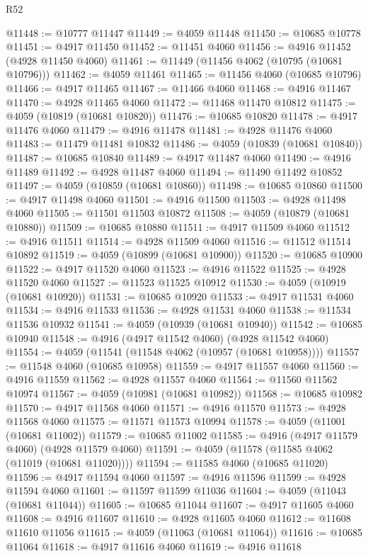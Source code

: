\begin{lexlean}{R52}
\begin{coremodule}
@11448 := @10777 @11447
@11449 := @4059 @11448
@11450 := @10685 @10778
@11451 := @4917 @11450
@11452 := @11451 @4060
@11456 := @4916 @11452 (@4928 @11450 @4060)
@11461 := @11449 (@11456 @4062 (@10795 (@10681 @10796)))
@11462 := @4059 @11461
@11465 := @11456 @4060 (@10685 @10796)
@11466 := @4917 @11465
@11467 := @11466 @4060
@11468 := @4916 @11467
@11470 := @4928 @11465 @4060
@11472 := @11468 @11470 @10812
@11475 := @4059 (@10819 (@10681 @10820))
@11476 := @10685 @10820
@11478 := @4917 @11476 @4060
@11479 := @4916 @11478
@11481 := @4928 @11476 @4060
@11483 := @11479 @11481 @10832
@11486 := @4059 (@10839 (@10681 @10840))
@11487 := @10685 @10840
@11489 := @4917 @11487 @4060
@11490 := @4916 @11489
@11492 := @4928 @11487 @4060
@11494 := @11490 @11492 @10852
@11497 := @4059 (@10859 (@10681 @10860))
@11498 := @10685 @10860
@11500 := @4917 @11498 @4060
@11501 := @4916 @11500
@11503 := @4928 @11498 @4060
@11505 := @11501 @11503 @10872
@11508 := @4059 (@10879 (@10681 @10880))
@11509 := @10685 @10880
@11511 := @4917 @11509 @4060
@11512 := @4916 @11511
@11514 := @4928 @11509 @4060
@11516 := @11512 @11514 @10892
@11519 := @4059 (@10899 (@10681 @10900))
@11520 := @10685 @10900
@11522 := @4917 @11520 @4060
@11523 := @4916 @11522
@11525 := @4928 @11520 @4060
@11527 := @11523 @11525 @10912
@11530 := @4059 (@10919 (@10681 @10920))
@11531 := @10685 @10920
@11533 := @4917 @11531 @4060
@11534 := @4916 @11533
@11536 := @4928 @11531 @4060
@11538 := @11534 @11536 @10932
@11541 := @4059 (@10939 (@10681 @10940))
@11542 := @10685 @10940
@11548 := @4916 (@4917 @11542 @4060) (@4928 @11542 @4060)
@11554 := @4059 (@11541 (@11548 @4062 (@10957 (@10681 @10958))))
@11557 := @11548 @4060 (@10685 @10958)
@11559 := @4917 @11557 @4060
@11560 := @4916 @11559
@11562 := @4928 @11557 @4060
@11564 := @11560 @11562 @10974
@11567 := @4059 (@10981 (@10681 @10982))
@11568 := @10685 @10982
@11570 := @4917 @11568 @4060
@11571 := @4916 @11570
@11573 := @4928 @11568 @4060
@11575 := @11571 @11573 @10994
@11578 := @4059 (@11001 (@10681 @11002))
@11579 := @10685 @11002
@11585 := @4916 (@4917 @11579 @4060) (@4928 @11579 @4060)
@11591 := @4059 (@11578 (@11585 @4062 (@11019 (@10681 @11020))))
@11594 := @11585 @4060 (@10685 @11020)
@11596 := @4917 @11594 @4060
@11597 := @4916 @11596
@11599 := @4928 @11594 @4060
@11601 := @11597 @11599 @11036
@11604 := @4059 (@11043 (@10681 @11044))
@11605 := @10685 @11044
@11607 := @4917 @11605 @4060
@11608 := @4916 @11607
@11610 := @4928 @11605 @4060
@11612 := @11608 @11610 @11056
@11615 := @4059 (@11063 (@10681 @11064))
@11616 := @10685 @11064
@11618 := @4917 @11616 @4060
@11619 := @4916 @11618

\end{coremodule}
\end{lexlean}
